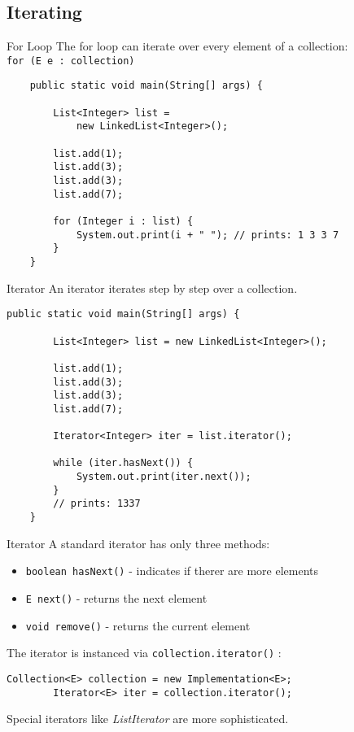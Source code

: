 \subsection{Iterating}
\begin{frame}[fragile]{For Loop}
	The for loop can iterate over every element of a collection:\\
	\hspace{1em}\texttt{for (E e : collection)}
	\begin{lstlisting}
	public static void main(String[] args) {
	
	    List<Integer> list = 
	        new LinkedList<Integer>();
	    
	    list.add(1);
	    list.add(3);
	    list.add(3);
	    list.add(7);
	    
	    for (Integer i : list) {
	        System.out.print(i + " "); // prints: 1 3 3 7
	    }
	}
	\end{lstlisting}
\end{frame}

\begin{frame}[fragile]{Iterator}
	An iterator iterates step by step over a collection.
	\begin{lstlisting}[basicstyle=\ttfamily\scriptsize]
	public static void main(String[] args) {
	
	    List<Integer> list = new LinkedList<Integer>();
	    
	    list.add(1);
	    list.add(3);
	    list.add(3);
	    list.add(7);
	    
	    Iterator<Integer> iter = list.iterator();
	    
	    while (iter.hasNext()) {
	        System.out.print(iter.next());
	    }
	    // prints: 1337
	}
	\end{lstlisting}
\end{frame}

\begin{frame}[fragile]{Iterator}
	A standard iterator has only three methods:
	\begin{itemize}
	\item \texttt{boolean hasNext()} - indicates if therer are more elements
	\item \texttt{E next()} - returns the next element
	\item \texttt{void remove()} - returns the current element
	\end{itemize}
	\vspace{1em}
	The iterator is instanced via \texttt{collection.iterator()} :
	\begin{lstlisting}[basicstyle=\ttfamily\scriptsize]
	    Collection<E> collection = new Implementation<E>;
	    Iterator<E> iter = collection.iterator();
	\end{lstlisting}
	Special iterators like \emph{ListIterator} are more sophisticated.
\end{frame}


